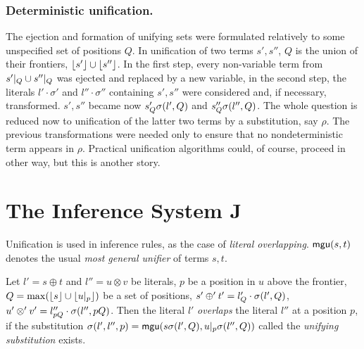 \subsubsection{Deterministic unification.}
%
The ejection and formation of unifying sets were formulated relatively to
some unspecified set of positions $Q$.  In unification of two terms $s',s''$,
$Q$ is the union of their frontiers, \(\lfloor s'\rfloor\cup \lfloor s''\rfloor\).  In the first step, every non-variable term from \(s'|_{Q}\cup s''|_{Q}\) was ejected and replaced by a new variable, in the
second step, the literals $l'\cdot\sigma'$ and $l''\cdot\sigma''$ containing
$s',s''$ were considered and, if necessary, transformed.  $s',s''$ became now
\(s'_Q\sigma(l',Q)\) and \(s''_Q\sigma(l'',Q)\).  The whole question is reduced
now to unification of the latter two terms by a substitution, say $\rho$.
The previous transformations were needed only to ensure that no 
nondeterministic term appears in $\rho$.  Practical unification algorithms 
could, of course, proceed in other way, but this is another story.

\section{The Inference System \C J}\label{se:reasoningNG}
%
%
Unification is used in inference rules, as the
case of {\em literal overlapping}.  \({\sf mgu}(s,t)\) denotes the 
usual {\em most general unifier} of terms $s,t$.

\begin{DEFINITION}\label {def:literal-overalap}
Let \(l'=s\oplus t\) and \(l''=u \otimes v\) be literals, $p$ be a position
in $u$ above the frontier, \(Q=\max(\lfloor s\rfloor \cup \lfloor u|_{p}\rfloor)\) be a set of positions, \( s'\oplus' t' = l'_Q \cdot \sigma(l',Q)\),
\(u'\otimes' v' = l''_{pQ} \cdot \sigma(l'',pQ)\).  Then the literal $l'$
{\em overlaps} the literal $l''$ at a position $p$, if the substitution
\(\sigma(l',l'',p) ={\sf mgu} (s\sigma(l',Q), u|_{p}\sigma(l'',Q))\)
called the {\em unifying substitution} exists.
\end{DEFINITION}

